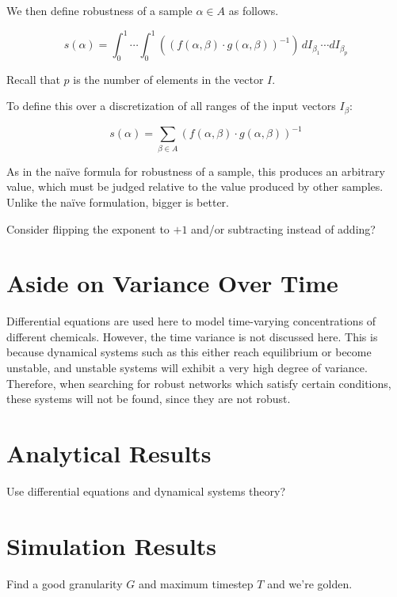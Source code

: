 \documentclass{article}
\begin{document}
We then define robustness of a sample $\alpha \in A$ as follows.

\begin{equation}
  s(\alpha) = \int_0^1 \cdots \int_0^1 ((f(\alpha, \beta) \cdot g(\alpha, \beta))^{-1}) \,dI_{\beta_1} \cdots dI_{\beta_p}
\end{equation}

Recall that $p$ is the number of elements in the vector $I$.

To define this over a discretization of all ranges of the input vectors $I_\beta$:

\begin{equation}
  s(\alpha) = \sum_{\beta \in A}{(f(\alpha, \beta) \cdot g(\alpha, \beta))^{-1}}
\end{equation}

As in the na\"ive formula for robustness of a sample, this produces an arbitrary value, which must be judged relative to the value produced by other samples. Unlike the na\"ive formulation, bigger is better.

Consider flipping the exponent to $+1$ and/or subtracting instead of adding?

\section{Aside on Variance Over Time}

Differential equations are used here to model time-varying concentrations of different chemicals. However, the time variance is not discussed here. This is because dynamical systems such as this either reach equilibrium or become unstable, and unstable systems will exhibit a very high degree of variance. Therefore, when searching for robust networks which satisfy certain conditions, these systems will not be found, since they are not robust.

\section{Analytical Results}
Use differential equations and dynamical systems theory?

\section{Simulation Results}
Find a good granularity $G$ and maximum timestep $T$ and we're golden.



\end{document}
